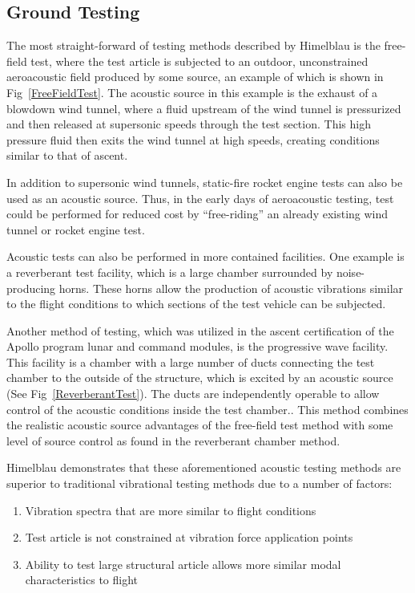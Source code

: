\documentclass[]{aiaa-tc}%
\begin{document}
\subsection{Ground Testing}

The most straight-forward of testing methods described by Himelblau is the free-field test, where the test article is subjected to an outdoor, unconstrained aeroacoustic field produced by some source, an example of which is shown in Fig~\ref{FreeFieldTest}.  The acoustic source in this example is the exhaust of a blowdown wind tunnel, where a fluid upstream of the wind tunnel is pressurized and then released at supersonic speeds through the test section.\cite{BlowdownWindTunnel}  This high pressure fluid then exits the wind tunnel at high speeds, creating conditions similar to that of ascent.



In addition to supersonic wind tunnels, static-fire rocket engine tests can also be used as an acoustic source.  Thus, in the early days of aeroacoustic testing, test could be performed for reduced cost by ``free-riding'' an already existing wind tunnel or rocket engine test.

Acoustic tests can also be performed in more contained facilities.  One example is a reverberant test facility, which is a large chamber surrounded by noise-producing horns.\cite{ReverberantChamber}  These horns allow the production of acoustic vibrations similar to the flight conditions to which sections of the test vehicle can be subjected.

Another method of testing, which was utilized in the ascent certification of the Apollo program lunar and command modules, is the progressive wave facility.  This facility is a chamber with a large number of ducts connecting the test chamber to the outside of the structure, which is excited by an acoustic source (See Fig~\ref{ReverberantTest}).  The ducts are independently operable to allow control of the acoustic conditions inside the test chamber.\cite{ProgressiveWaveChamber}.  This method combines the realistic acoustic source advantages of the free-field test method with some level of source control as found in the reverberant chamber method.





Himelblau demonstrates that these aforementioned acoustic testing methods are superior to traditional vibrational testing methods due to a number of factors:
\begin{enumerate}
  \item Vibration spectra that are more similar to flight conditions
  \item Test article is not constrained at vibration force application points
  \item Ability to test large structural article allows more similar modal characteristics to flight
\end{enumerate}
\end{document}
